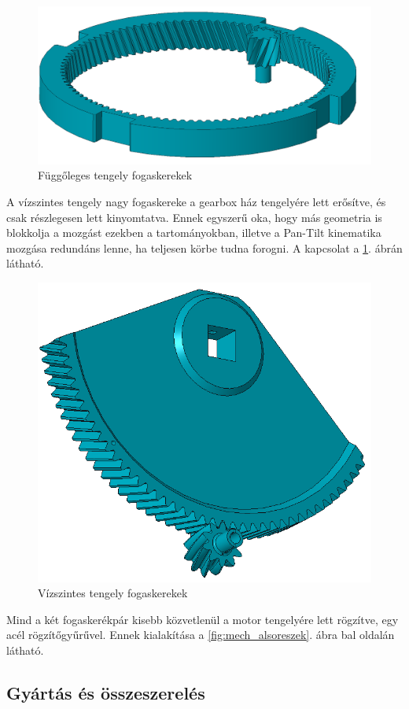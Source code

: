\documentclass[12pt,a4paper]{article}
\begin{document}
\begin{figure}[h!]
	\centering
	\includegraphics[width=1\linewidth]{mech_fogpar1}
	\caption{Függőleges tengely fogaskerekek}
	\label{fig:mech_fogpar1}
\end{figure}

A vízszintes tengely nagy fogaskereke a gearbox ház tengelyére lett erősítve, és csak részlegesen lett kinyomtatva. Ennek egyszerű oka, hogy más geometria is blokkolja a mozgást ezekben a tartományokban, illetve a Pan-Tilt kinematika mozgása redundáns lenne, ha teljesen körbe tudna forogni. A kapcsolat a \ref{fig:mech_fogpar1}. ábrán látható.

\begin{figure}[h!]
	\centering
	\includegraphics[width=0.7\linewidth]{mech_fogpar2}
	\caption{Vízszintes tengely fogaskerekek}
	\label{fig:mech_fogpar2}
\end{figure}

Mind a két fogaskerékpár kisebb közvetlenül a motor tengelyére lett rögzítve, egy acél rögzítőgyűrűvel. Ennek kialakítása a \ref{fig:mech_alsoreszek}. ábra bal oldalán látható.

\subsection{Gyártás és összeszerelés}
\end{document}
